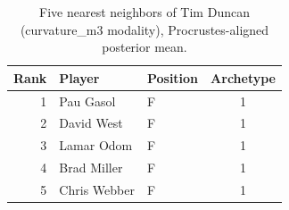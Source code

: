 \begin{table}[htbp]
  \centering\small
  \begin{tabular}{rllc}
    \toprule
    Rank & Player & Position & Archetype \\
    \midrule
    1 & Pau Gasol & F & 1 \\
    2 & David West & F & 1 \\
    3 & Lamar Odom & F & 1 \\
    4 & Brad Miller & F & 1 \\
    5 & Chris Webber & F & 1 \\
    \bottomrule
  \end{tabular}
  \caption{Five nearest neighbors of Tim Duncan (curvature_m3 modality), Procrustes-aligned posterior mean.}
  \label{tab:Tim_Duncan_neighbors_curvature_m3}
\end{table}

